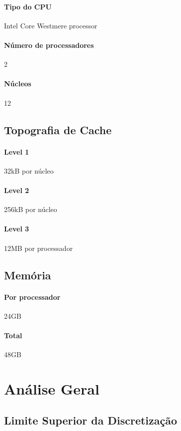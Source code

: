 \documentclass[12pt]{article}
\begin{document}
\paragraph{Tipo do CPU} Intel Core Westmere processor
\paragraph{Número de processadores} 2
\paragraph{Núcleos} 12

\subsection{Topografia de Cache}
\paragraph{Level 1} 32kB por núcleo
\paragraph{Level 2} 256kB por núcleo
\paragraph{Level 3} 12MB por processador

\subsection{Memória}
\paragraph{Por processador} 24GB
\paragraph{Total} 48GB

\newpage


\newpage

\section{Análise Geral}

	\subsection{Limite Superior da Discretização}
\end{document}
